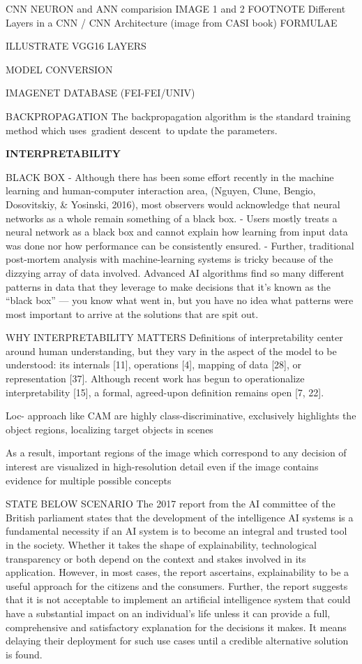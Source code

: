 CNN
NEURON  and ANN comparision
IMAGE 1 and 2 FOOTNOTE
Different Layers in a CNN / CNN Architecture (image from CASI book)
FORMULAE

ILLUSTRATE VGG16 LAYERS

MODEL CONVERSION

IMAGENET DATABASE (FEI-FEI/UNIV)

BACKPROPAGATION
The backpropagation algorithm is the standard training method which uses gradient descent to update the parameters.

\textbf{INTERPRETABILITY}

BLACK BOX
- Although there has been some effort recently in the machine learning and human-computer interaction area, (Nguyen, Clune, Bengio, Dosovitskiy, & Yosinski, 2016), most observers would acknowledge that neural networks as a whole remain something of a black box.
- Users mostly treats a neural network as a black box and cannot explain how learning from input data was done nor how performance can be consistently ensured.
- Further, traditional post-mortem analysis with machine-learning systems is tricky because of the dizzying array of data involved. Advanced AI algorithms find so many different patterns in data that they leverage to make decisions that it’s known as the “black box” — you know what went in, but you have no idea what patterns were most important to arrive at the solutions that are spit out.

WHY INTERPRETABILITY MATTERS
Definitions of interpretability center around human understanding, but they vary in the aspect of the model to be understood: its internals [11], operations [4], mapping of data [28], or representation [37]. Although recent work has begun to operationalize interpretability [15], a formal, agreed-upon definition remains open [7, 22].

Loc- approach like CAM are highly class-discriminative, exclusively highlights the object regions, localizing target objects in scenes

As a result, important regions of the image which correspond
to any decision of interest are visualized in high-resolution
detail even if the image contains evidence for multiple possible concepts

STATE BELOW SCENARIO
The 2017 report from the AI committee of the British parliament states that the development of the intelligence AI systems is a fundamental necessity if an AI system is to become an integral and trusted tool in the society. Whether it takes the shape of explainability, technological transparency or both depend on the context and stakes involved in its application. However, in most cases, the report ascertains, explainability to be a useful approach for the citizens and the consumers. Further, the report suggests that it is not acceptable to implement an artificial intelligence system that could have a substantial impact on an individual's life unless it can provide a full, comprehensive and satisfactory explanation for the decisions it makes. It means delaying their deployment for such use cases until a credible alternative solution is found.

